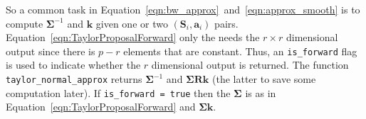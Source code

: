 \documentclass[9pt, notitlepage]{article}
\renewcommand{\vec}[1]{\bm{#1}}
\newcommand{\mat}[1]{\mathbf{#1}}
\newcommand{\dimState}{p}
\newcommand{\dimRng}{r}
\begin{document}
So a common task in Equation~\eqref{eqn:bw_approx}~and~\eqref{eqn:approx_smooth} is to compute $\mat{\Sigma}^{-1}$ and $\vec{k}$ given one or two $(\mat{S}_i,\vec{a}_i)$ pairs. Equation~\eqref{eqn:TaylorProposalForward} only the needs the $\dimRng\times\dimRng$ dimensional output since there is $\dimState - \dimRng$ elements that are constant. Thus, an \texttt{is\_forward} flag is used to indicate whether the $\dimRng$ dimensional output is returned. The function \texttt{taylor\_normal\_approx} returns $\mat{\Sigma}^{-1}$ and $\mat{\Sigma}\mat{R}\vec{k}$ (the latter to save some computation later). If \texttt{is\_forward = true} then the  $\mat{\Sigma}$ is as in Equation~\eqref{eqn:TaylorProposalForward} and  $\mat{\Sigma}\vec{k}$.





\newpage


\end{document}
